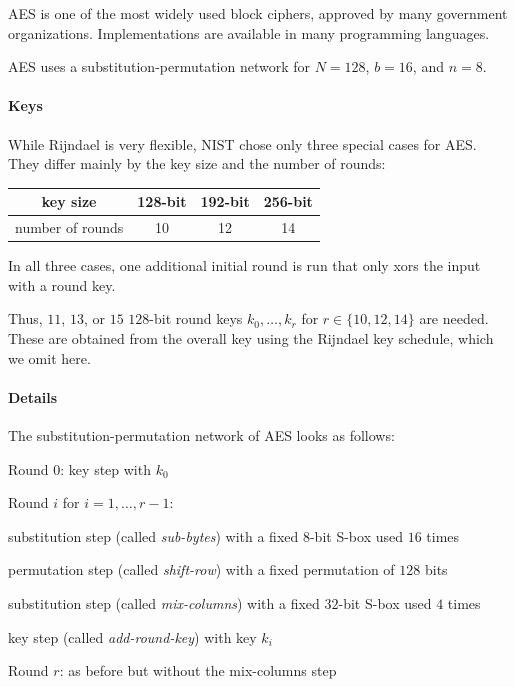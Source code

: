 AES is one of the most widely used block ciphers, approved by many government organizations.
Implementations are available in many programming languages.

AES uses a substitution-permutation network for $N=128$, $b=16$, and $n=8$.

\paragraph{Keys}
While Rijndael is very flexible, NIST chose only three special cases for AES.
They differ mainly by the key size and the number of rounds:
\begin{center}
  \begin{tabular}{|c|c|c|c|}
  	\hline key size & 128-bit & 192-bit & 256-bit \\ 
  	\hline number of rounds & 10 & 12 & 14 \\ 
  	\hline
  \end{tabular}
\end{center}
In all three cases, one additional initial round is run that only xors the input with a round key.

Thus, $11$, $13$, or $15$ $128$-bit round keys $k_0,\ldots,k_r$ for $r\in\{10,12,14\}$ are needed.
These are obtained from the overall key using the Rijndael key schedule, which we omit here.

\paragraph{Details}
The substitution-permutation network of AES looks as follows:
\begin{compactenum}
 \item Round 0: key step with $k_0$
 \item Round $i$ for $i=1,\ldots,r-1$:
  \begin{compactenum}
    \item substitution step (called \emph{sub-bytes}) with a fixed $8$-bit S-box used $16$ times
    \item permutation step (called \emph{shift-row}) with a fixed permutation of $128$ bits
    \item substitution step (called \emph{mix-columns}) with a fixed $32$-bit S-box used $4$ times
    \item key step (called \emph{add-round-key}) with key $k_i$
  \end{compactenum}
 \item Round $r$: as before but without the mix-columns step
\end{compactenum}

